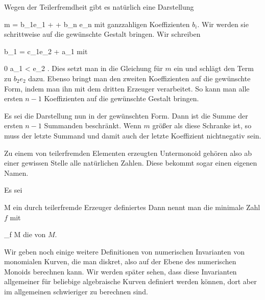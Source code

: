 {





Wegen der Teilerfremdheit gibt es natürlich eine Darstellung

\mavergleichskettedisp
{\vergleichskette
{ m
}
{ =} { b_1e_1 + \cdots + b_n e_n
}
{ } {
}
{ } {
}
{ } {
}
}
{}{}{}
mit ganzzahligen Koeffizienten $b_i$. Wir werden sie schrittweise auf die gewün\-schte Gestalt bringen. Wir schreiben

\mavergleichskette
{\vergleichskette
{ b_1
}
{ = }{ c_1e_2 + a_1
}
{  }{
}
{    }{
}
{   }{
}
}
{}{}{}
mit

\mavergleichskette
{\vergleichskette
{ 0
}
{ \leq }{ a_1
}
{ < }{ e_2
}
{    }{
}
{   }{
}
}
{}{}{}
 {} {.}
Dies setzt man in die Gleichung für $m$ ein und schlägt den Term
 zu $b_2e_2$ dazu. Ebenso bringt man den
 {} {}
zweiten Koeffizienten auf die gewünschte Form, indem man ihn mit dem dritten Erzeuger verarbeitet. So kann man alle ersten $n-1$ Koeffizienten auf die gewünschte Gestalt bringen.

Es sei die Darstellung nun in der gewünschten Form. Dann ist die Summe der ersten $n-1$ Summanden beschränkt. Wenn $m$ größer als diese Schranke ist, so muss der letzte Summand und damit auch der letzte Koeffizient nichtnegativ sein.




}



Zu einem von teilerfremden Elementen erzeugten Untermonoid gehören also ab einer gewissen Stelle alle natürlichen Zahlen. Diese bekommt sogar einen eigenen Namen.


{}
{





Es sei

\mavergleichskette
{\vergleichskette
{M
}
{ \subseteq }{\N
}
{  }{
}
{    }{
}
{   }{
}
}
{}{}{}
ein durch teilerfremde Erzeuger definiertes
Dann nennt man die minimale Zahl $f$ mit

\mavergleichskette
{\vergleichskette
{ \N_{\geq f}
}
{ \subseteq }{ M
}
{  }{
}
{    }{
}
{   }{
}
}
{}{}{}
die  von $M$.





}

Wir geben noch einige weitere Definitionen von numerischen Invarianten von monomialen Kurven, die man diskret, also auf der Ebene des numerischen Monoids berechnen kann. Wir werden später sehen, dass diese Invarianten allgemeiner für beliebige algebraische Kurven definiert werden können, dort aber im allgemeinen schwieriger zu berechnen sind.


